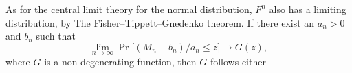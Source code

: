 As for the central limit theory for the normal distribution, $F^n$ also has a limiting distribution, by The Fisher–Tippett–Gnedenko theorem. If there exist an $a_n>0$ and $b_n$ such that 
\begin{equation}
\lim_{n \to \infty} \Pr\big[(M_n-b_n)/a_n \leq z\big]\to G(z),
\end{equation}
where $G$ is a non-degenerating function, then $G$ follows either

